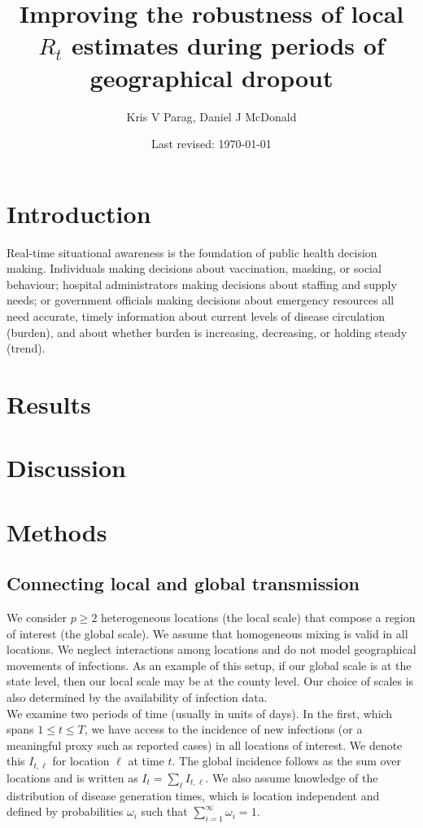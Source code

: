 \documentclass[12pt]{article}
\title{\huge Improving the robustness of local $R_t$ estimates during periods of geographical dropout}
\author{Kris V Parag, Daniel J McDonald}
\date{Last revised: \today}
\begin{document}
\maketitle

\section*{Introduction}

Real-time situational awareness is the foundation of public health decision making. 
Individuals making decisions about vaccination, masking, or social behaviour; hospital administrators making decisions about staffing and supply needs; or government officials making decisions about emergency resources all need accurate, timely information about current levels of disease circulation (burden), and about whether burden is increasing, decreasing, or holding steady (trend).


\section*{Results}


\section*{Discussion}


\section*{Methods}
\subsection*{Connecting local and global transmission}\label{sec:bayes}

We consider $p\geq 2$ heterogeneous locations (the local scale) that compose a region of interest (the global scale). We assume that homogeneous mixing is valid in all locations. We neglect interactions among locations and do not model geographical movements of infections. As an example of this setup, if our global scale is at the state level, then our local scale may be at the county level. Our choice of scales is also determined by the availability of infection data.\\

We examine two periods of time (usually in units of days). In the first, which spans $1\leq t \leq T$, we have access to the incidence of new infections (or a meaningful proxy such as reported cases) in all locations of interest. We denote this $I_{t, \ell}$ for location $\ell$ at time $t$. The global incidence follows as the sum over locations and is written as $I_t = \sum_{\ell} I_{t, \ell}$. We also assume knowledge of the distribution of disease generation times, which is location independent and defined by probabilities $\omega_i$ such that $\sum_{i=1}^{\infty}\omega_{i} = 1$.\\
\end{document}
